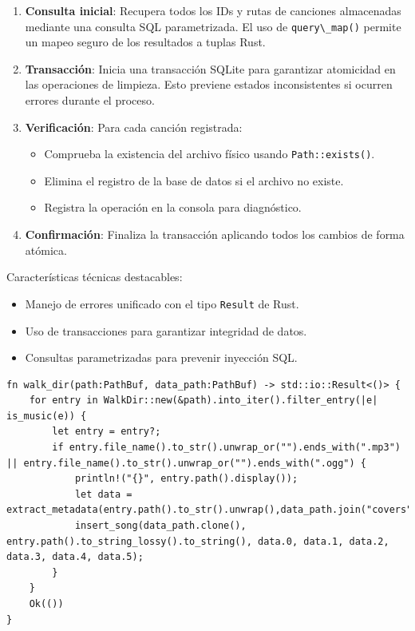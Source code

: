 \documentclass[11pt, a4paper]{article}
\begin{document}
            \begin{enumerate}
              \item \textbf{Consulta inicial}: Recupera todos los IDs y rutas de canciones almacenadas mediante una consulta SQL parametrizada. El uso de \verb|query\_map()| permite un mapeo seguro de los resultados a tuplas Rust.

              \item \textbf{Transacción}: Inicia una transacción SQLite para garantizar atomicidad en las operaciones de limpieza. Esto previene estados inconsistentes si ocurren errores durante el proceso.

              \item \textbf{Verificación}: Para cada canción registrada:
                \begin{itemize}
                  \item Comprueba la existencia del archivo físico usando \verb|Path::exists()|.
                  \item Elimina el registro de la base de datos si el archivo no existe.
                  \item Registra la operación en la consola para diagnóstico.
                \end{itemize}

              \item \textbf{Confirmación}: Finaliza la transacción aplicando todos los cambios de forma atómica.
            \end{enumerate}

            Características técnicas destacables:
            \begin{itemize}
              \item Manejo de errores unificado con el tipo \verb|Result| de Rust.
              \item Uso de transacciones para garantizar integridad de datos.
              \item Consultas parametrizadas para prevenir inyección SQL.
            \end{itemize}

            \begin{lstlisting}[caption={fn walk\_dir()}]
 fn walk_dir(path:PathBuf, data_path:PathBuf) -> std::io::Result<()> {
    for entry in WalkDir::new(&path).into_iter().filter_entry(|e| is_music(e)) {
        let entry = entry?;
        if entry.file_name().to_str().unwrap_or("").ends_with(".mp3") || entry.file_name().to_str().unwrap_or("").ends_with(".ogg") {
            println!("{}", entry.path().display());
            let data = extract_metadata(entry.path().to_str().unwrap(),data_path.join("covers"))?;
            insert_song(data_path.clone(), entry.path().to_string_lossy().to_string(), data.0, data.1, data.2, data.3, data.4, data.5);
        }
    }
    Ok(())
}
            \end{lstlisting}
\end{document}
